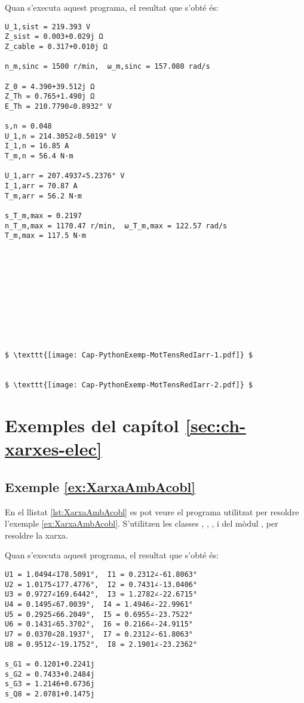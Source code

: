 Quan s'executa aquest programa, el resultat que s'obté és:
\lstset{
	language=,
	numbers=none,
	frame=none
}
\begin{lstlisting}[mathescape=true]
U_1,sist = 219.393 V
Z_sist = 0.003+0.029j Ω
Z_cable = 0.317+0.010j Ω

n_m,sinc = 1500 r/min,  ω_m,sinc = 157.080 rad/s

Z_0 = 4.390+39.512j Ω
Z_Th = 0.765+1.490j Ω
E_Th = 210.7790∠0.8932° V

s,n = 0.048
U_1,n = 214.3052∠0.5019° V
I_1,n = 16.85 A
T_m,n = 56.4 N·m

U_1,arr = 207.4937∠5.2376° V
I_1,arr = 70.87 A
T_m,arr = 56.2 N·m

s_T_m,max = 0.2197
n_T_m,max = 1170.47 r/min,  ω_T_m,max = 122.57 rad/s
T_m,max = 117.5 N·m










	
$ \texttt{[image: Cap-PythonExemp-MotTensRedIarr-1.pdf]} $


$ \texttt{[image: Cap-PythonExemp-MotTensRedIarr-2.pdf]} $
\end{lstlisting} 

\pagebreak





\section{Exemples del capítol \ref*{sec:ch-xarxes-elec}}

\hypertarget{exemple:XarxaAmbAcobl}{\subsection{Exemple \ref*{ex:XarxaAmbAcobl} \XarxaAmbAcobl}}
En el llistat \vref{lst:XarxaAmbAcobl} es pot veure el programa utilitzat per resoldre l'exemple \vref{ex:XarxaAmbAcobl}. S'utilitzen les classes , , ,  i  del mòdul ,  per resoldre la xarxa.


Quan s'executa aquest programa, el resultat que s'obté és:
\lstset{
	language=,
	numbers=none,
	frame=none
}
\begin{lstlisting}
U1 = 1.0494∠178.5091°,  I1 = 0.2312∠-61.8063° 
U2 = 1.0175∠177.4776°,  I2 = 0.7431∠-13.0406° 
U3 = 0.9727∠169.6442°,  I3 = 1.2782∠-22.6715° 
U4 = 0.1495∠67.0039°,  I4 = 1.4946∠-22.9961° 
U5 = 0.2925∠66.2049°,  I5 = 0.6955∠-23.7522° 
U6 = 0.1431∠65.3702°,  I6 = 0.2166∠-24.9115° 
U7 = 0.0370∠28.1937°,  I7 = 0.2312∠-61.8063° 
U8 = 0.9512∠-19.1752°,  I8 = 2.1901∠-23.2362° 

s_G1 = 0.1201+0.2241j
s_G2 = 0.7433+0.2484j
s_G3 = 1.2146+0.6736j
s_Q8 = 2.0781+0.1475j
\end{lstlisting} 



